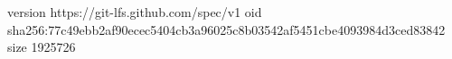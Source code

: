 version https://git-lfs.github.com/spec/v1
oid sha256:77c49ebb2af90ecec5404cb3a96025c8b03542af5451cbe4093984d3ced83842
size 1925726
